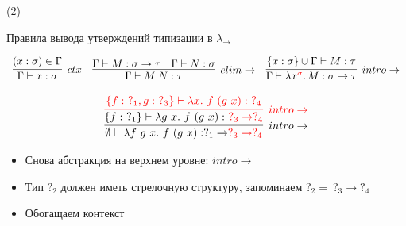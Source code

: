     \begin{frame}[t, noframenumbering]{\btypename (2)}
        \begin{block}{Правила вывода утверждений типизации в $\lambda_{\rightarrow}$}
            \vspace{-1em}
            \begin{center}
                \[
                    \begin{array}{l c r}
                        \infer[ctx]{\Gamma \vdash x: \sigma}{(x: \sigma) \in \Gamma}
                        &
                        \infer[elim\to]{\Gamma \vdash M\;N : \tau}{\Gamma \vdash M : \sigma \to \tau & \Gamma \vdash N : \sigma}
                        &
                        \infer[intro\to]{\Gamma \vdash \lambda x^{\color{red} \sigma}\ldotp M : \sigma \to \tau}{\{x : \sigma\} \cup \Gamma \vdash M : \tau}
                    \end{array}
                \]
            \end{center}
        \end{block}
        \[
            \infer[intro\to]{\emptyset \vdash \lambda f~g~x.~f~(g~x) : ?_1 \to \color{red} ?_3 \to ?_4}{
                \color{red}\infer[intro\to]{\color{black}\{f :~ ?_1\} \vdash \lambda g~x.~f~(g~x) :~ \color{red}?_3 \to ?_4}{
                        {\{f :~ ?_1, g :~ ?_3\} \vdash \lambda x.~f~(g~x) :~ ?_4 }
                }}
        \]
        \vspace{-1em}
        \begin{itemize}
            \item Снова абстракция на верхнем уровне: $intro\to$
            \item Тип $?_2$ должен иметь стрелочную структуру, запоминаем $?_2 =~ ?_3 \to ?_4$
            \item Обогащаем контекст
        \end{itemize}
    \end{frame}

